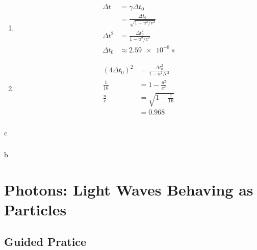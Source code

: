 \documentclass{article}
\begin{document}
\setcounter{subsubsection}{64}
\subsubsection{}

\begin{enumerate}
  \item

        \begin{align*}
          \Delta t   & = \gamma \Delta t_0                       \\
                     & = \frac{\Delta t_0}{\sqrt{1 - u^2 / v^2}} \\
          \Delta t^2 & = \frac{\Delta t_0^2}{1 - u^2 / c^2}      \\
          \Delta t_0 & \approx \qty{2.59e-8}{s}
        \end{align*}

  \item

        \begin{align*}
          (4 \Delta t_0)^2 & = \frac{\Delta t_0^2}{1 - u^2 / c^2} \\
          \frac{1}{16}     & = 1 - \frac{u^2}{c^2}                \\
          \frac{u}{c}      & = \sqrt{1 - \frac{1}{16}}            \\
                           & = 0.968
        \end{align*}
\end{enumerate}

\setcounter{subsubsection}{70}
\subsubsection{}

c

\setcounter{subsubsection}{72}
\subsubsection{}

b

\section{Photons: Light Waves Behaving as Particles}

\subsection{Guided Pratice}
\end{document}

